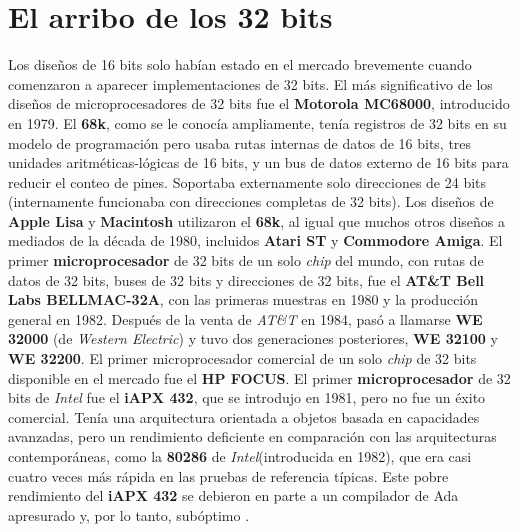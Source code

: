 \section{El arribo de los 32 bits}
Los diseños de 16 bits solo habían estado en el mercado brevemente cuando comenzaron a aparecer implementaciones de 32 bits.
El más significativo de los diseños de  microprocesadores de 32 bits fue el \textbf{Motorola MC68000}, introducido en 1979. 
El \textbf{68k}, como se le conocía ampliamente, tenía  registros de 32 bits en su modelo de programación pero usaba rutas internas
de datos de 16 bits, tres unidades aritméticas-lógicas de 16 bits, y un bus de datos externo de 16 bits para reducir 
el conteo de pines. Soportaba externamente solo direcciones de 24 bits (internamente funcionaba con direcciones completas de 
32 bits). Los diseños de \textbf{Apple Lisa} y \textbf{Macintosh} utilizaron el \textbf{68k}, al igual que muchos otros diseños a
mediados de la década de 1980, incluidos \textbf{Atari ST} y \textbf{Commodore Amiga}. El primer \textbf{microprocesador} de 32 bits de
un solo \emph{chip} del mundo, con rutas de datos de 32 bits, buses de 32 bits y direcciones de 32 bits, fue el \textbf{AT\&T Bell Labs BELLMAC-32A},
con las primeras muestras en 1980 y la producción general en 1982. Después de la venta de \emph{AT\&T} en 1984, pasó a llamarse \textbf{WE 32000}
(de \emph{Western Electric}) y tuvo dos generaciones posteriores, \textbf{WE 32100} y \textbf{WE 32200}. El primer microprocesador comercial de
un solo \emph{chip} de 32 bits disponible en el mercado fue el \textbf{HP FOCUS}. El primer \textbf{microprocesador} de 32 bits de \emph{Intel} 
fue el \textbf{iAPX 432}, que se introdujo en 1981, pero no fue un éxito comercial. Tenía una arquitectura orientada a objetos basada en capacidades avanzadas,
pero un rendimiento deficiente en comparación con las arquitecturas contemporáneas, como la \textbf{80286} de \emph{Intel}(introducida en 1982),
que era casi cuatro veces más rápida en las pruebas de referencia típicas. Este pobre rendimiento del \textbf{iAPX 432} se debieron en parte a un
compilador de Ada apresurado y, por lo tanto, subóptimo .


